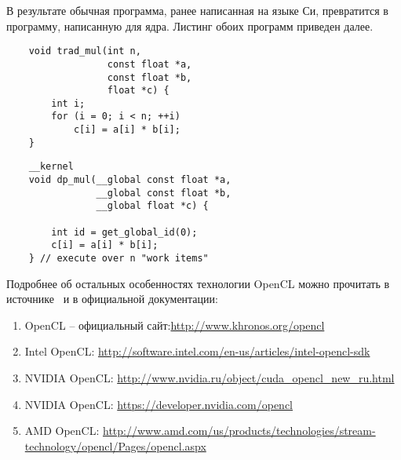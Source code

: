 \inputminted{c++}{listings/opencl_kernel_example.cpp}

В результате обычная программа, ранее написанная на языке Си, превратится в программу, написанную для ядра. Листинг обоих программ приведен далее.

\noindent
\begin{minipage}[t]{.5\textwidth}
    \begin{verbatim}
    void trad_mul(int n, 
                  const float *a, 
                  const float *b, 
                  float *c) {
        int i;
        for (i = 0; i < n; ++i)
            c[i] = a[i] * b[i];
    }
    \end{verbatim}
\end{minipage}%
\begin{minipage}[t]{.5\textwidth}
    \begin{verbatim}
    __kernel 
    void dp_mul(__global const float *a, 
                __global const float *b, 
                __global float *c) {

        int id = get_global_id(0);
        c[i] = a[i] * b[i];
    } // execute over n "work items"
    \end{verbatim}
\end{minipage}

\bigskip

Подробнее об остальных особенностях технологии OpenCL можно прочитать в источнике~\cite{Bastrakov2011} %
и в официальной документации:

\begin{enumerate}
    \item OpenCL -- официальный сайт:\url{http://www.khronos.org/opencl}
    \item Intel OpenCL: \url{http://software.intel.com/en-us/articles/intel-opencl-sdk}
    \item NVIDIA OpenCL: \url{http://www.nvidia.ru/object/cuda_opencl_new_ru.html}
    \item NVIDIA OpenCL: \url{https://developer.nvidia.com/opencl}
    \item AMD OpenCL: \url{http://www.amd.com/us/products/technologies/stream-technology/opencl/Pages/opencl.aspx}
\end{enumerate}
